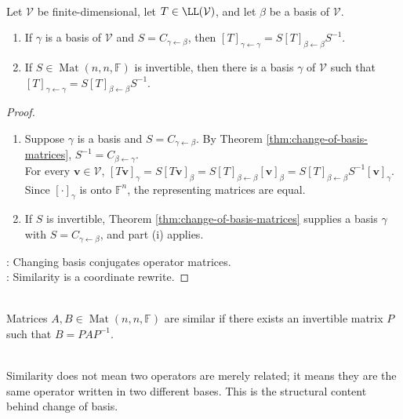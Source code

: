 \begin{theorem} \label{thm:change-of-basis-formula} \\
Let $\mathcal{V}$ be finite-dimensional, let $T \in \LL(\mathcal{V})$, and let $\beta$ be a basis of $\mathcal{V}$.
\begin{enumerate}[label=(\roman*)]
\setlength{\itemsep}{0pt}
\item If $\gamma$ is a basis of $\mathcal{V}$ and $S=C_{\gamma \leftarrow \beta}$, then $[T]_{\gamma \leftarrow \gamma} = S[T]_{\beta \leftarrow \beta}S^{-1}$.
\item If $S\in\operatorname{Mat}(n,n,\mathbb{F})$ is invertible, then there is a basis $\gamma$ of $\mathcal{V}$ such that $[T]_{\gamma \leftarrow \gamma} = S[T]_{\beta \leftarrow \beta}S^{-1}$.
\end{enumerate}
\begin{proof}
\begin{enumerate}[label=(\roman*)]
\setlength{\itemsep}{0pt}
\item Suppose $\gamma$ is a basis and $S=C_{\gamma \leftarrow \beta}$. By Theorem \ref{thm:change-of-basis-matrices}, $S^{-1}=C_{\beta \leftarrow \gamma}$.\\
For every $\mathbf{v}\in\mathcal{V}$, $[T\mathbf{v}]_{\gamma} =S[T\mathbf{v}]_{\beta} =S[T]_{\beta \leftarrow \beta}[\mathbf{v}]_{\beta} =S[T]_{\beta \leftarrow \beta}S^{-1}[\mathbf{v}]_{\gamma}$.\\
Since $[\cdot]_{\gamma}$ is onto $\mathbb{F}^n$, the representing matrices are equal.
\item If $S$ is invertible, Theorem \ref{thm:change-of-basis-matrices} supplies a basis $\gamma$ with $S=C_{\gamma \leftarrow \beta}$, and part (i) applies.
\end{enumerate}
: Changing basis conjugates operator matrices.\\
: Similarity is a coordinate rewrite.
\end{proof}
\end{theorem}

\begin{definition} \\
Matrices $A,B \in \operatorname{Mat}(n,n,\mathbb{F})$ are similar if there exists an invertible matrix $P$ such that $B = PAP^{-1}$.
\end{definition}

\begin{perspective} \\
Similarity does not mean two operators are merely related; it means they are the same operator written in two different bases. This is the structural content behind change of basis.
\end{perspective}

